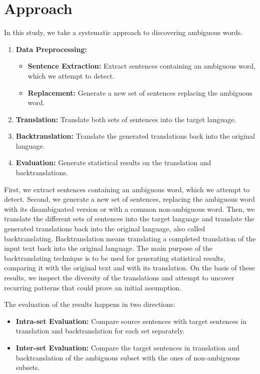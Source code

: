 \section{Approach}
\label{sec:Methodology:Approach}


In this study, we take a systematic approach to discovering ambiguous words. 

\begin{enumerate}
  \item \textbf{Data Preprocessing:}
  \begin{itemize}
    \item \textbf{Sentence Extraction:} Extract sentences containing an ambiguous word, which we attempt to detect.
    \item \textbf{Replacement:} Generate a new set of sentences replacing the ambiguous word.
  \end{itemize}
  \item \textbf{Translation:} Translate both sets of sentences into the target language.
  \item \textbf{Backtranslation:} Translate the generated translations back into the original language.
  \item \textbf{Evaluation:} Generate statistical results on the translation and backtranslations.
\end{enumerate}

First, we extract sentences containing an ambiguous word, which we attempt to detect. Second, we generate a new set of sentences, replacing the ambiguous word with its disambiguated version or with a common non-ambiguous word. Then, we translate the different sets of sentences into the target language and translate the generated translations back into the original language, also called backtranslating.
Backtranslation means translating a completed translation of the input text back into the original language. The main purpose of the backtranslating technique is to be used for generating statistical results, comparing it with the original text and with its translation. On the basis of these results, we inspect the diversity of the translations and attempt to uncover recurring patterns that could prove an initial assumption. 


The evaluation of the results happens in two directions:
\begin{itemize}
    \item \textbf{Intra-set Evaluation:} Compare source sentences with target sentences in translation and backtranslation for each set separately.
    \item \textbf{Inter-set Evaluation:} Compare the target sentences in translation and backtranslation of the ambiguous subset with the ones of non-ambiguous subsets.
\end{itemize}


